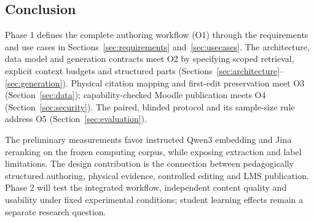 \subsection{Conclusion}
Phase 1 defines the complete authoring workflow (O1) through the requirements and use cases in Sections~\ref{sec:requirements} and~\ref{sec:usecases}. The architecture, data model and generation contracts meet O2 by specifying scoped retrieval, explicit context budgets and structured parts (Sections~\ref{sec:architecture}--\ref{sec:generation}). Physical citation mapping and first-edit preservation meet O3 (Section~\ref{sec:data}); capability-checked Moodle publication meets O4 (Section~\ref{sec:security}). The paired, blinded protocol and its sample-size rule address O5 (Section~\ref{sec:evaluation}).

The preliminary measurements favor instructed Qwen3 embedding and Jina reranking on the frozen computing corpus, while exposing extraction and label limitations. The design contribution is the connection between pedagogically structured authoring, physical evidence, controlled editing and LMS publication. Phase 2 will test the integrated workflow, independent content quality and usability under fixed experimental conditions; student learning effects remain a separate research question.
